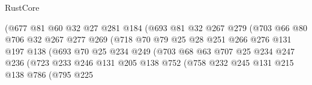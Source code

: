 \begin{lexlean}{RustCore}
\begin{coremodule}
                              (@677
                                @81
                                @60
                                @32
                                @27
                                @281
                                @184
                                (@693
                                  @81
                                  @32
                                  @267
                                  @279
                                  (@703
                                    @66
                                    @80
                                    @706
                                    @32
                                    @267
                                    @277
                                    @269
                                    (@718
                                      @70
                                      @79
                                      @25
                                      @28
                                      @251
                                      @266
                                      @276
                                      @131
                                      @197
                                      @138
                                      (@693
                                        @70
                                        @25
                                        @234
                                        @249
                                        (@703
                                          @68
                                          @63
                                          @707
                                          @25
                                          @234
                                          @247
                                          @236
                                          (@723
                                            @233
                                            @246
                                            @131
                                            @205
                                            @138
                                            @752
                                            (@758
                                              @232
                                              @245
                                              @131
                                              @215
                                              @138
                                              @786
                                              (@795
                                                @225

\end{coremodule}
\end{lexlean}

